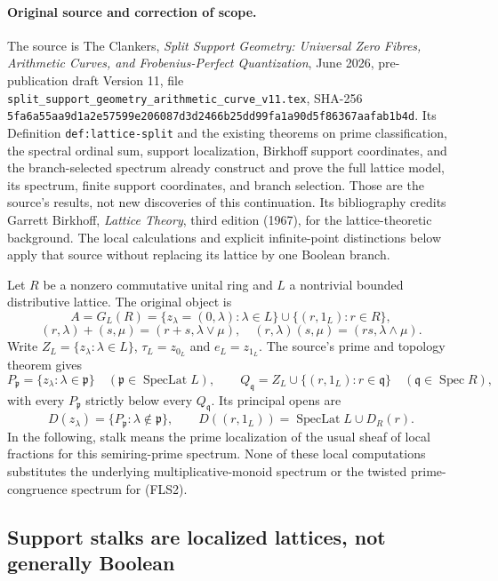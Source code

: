 \documentclass[11pt]{article}
\begin{document}
\paragraph{Original source and correction of scope.}
The source is The Clankers, \emph{Split Support Geometry: Universal
Zero Fibres, Arithmetic Curves, and Frobenius-Perfect Quantization},
June 2026, pre-publication draft Version 11, file
\texttt{split\_support\_geometry\_arithmetic\_curve\_v11.tex},
SHA-256 \texttt{5fa6a55aa9d1a2e57599e206087d3d2466b25dd99fa1a90d5f86367aafab1b4d}.
Its Definition \texttt{def:lattice-split} and the existing theorems
on prime classification, the spectral ordinal sum, support
localization, Birkhoff support coordinates, and the branch-selected
spectrum already construct and prove
the full lattice model, its spectrum, finite support coordinates,
and branch selection. Those are the source's results, not new
discoveries of this continuation. Its bibliography credits
Garrett Birkhoff, \emph{Lattice Theory}, third edition (1967),
for the lattice-theoretic background. The local calculations
and explicit infinite-point distinctions below apply that
source without replacing its lattice by one Boolean branch.

Let $R$ be a nonzero commutative unital ring and $L$ a nontrivial
bounded distributive lattice. The original object is
\[
A=G_L(R)=\{z_\lambda=(0,\lambda):\lambda\in L\}
\cup\{(r,1_L):r\in R\},
\]
\[
(r,\lambda)+(s,\mu)=(r+s,\lambda\vee\mu),
\quad (r,\lambda)(s,\mu)=(rs,\lambda\wedge\mu).
\tag{FLS1}
\]
Write $Z_L=\{z_\lambda:\lambda\in L\}$,
$\tau_L=z_{0_L}$ and $e_L=z_{1_L}$. The source's prime and
topology theorem gives
\[
P_{\mathfrak p}=\{z_\lambda:\lambda\in\mathfrak p\}
\quad(\mathfrak p\in\operatorname{SpecLat}L),\qquad
Q_{\mathfrak q}=Z_L\cup\{(r,1_L):r\in\mathfrak q\}
\quad(\mathfrak q\in\operatorname{Spec}R),
\tag{FLS2}
\]
with every $P_{\mathfrak p}$ strictly below every
$Q_{\mathfrak q}$. Its principal opens are
\[
D(z_\lambda)=\{P_{\mathfrak p}:\lambda\notin\mathfrak p\},
\qquad
D((r,1_L))=\operatorname{SpecLat}L\cup D_R(r).
\tag{FLS3}
\]
In the following, stalk means the prime localization of the
usual sheaf of local fractions for this semiring-prime
spectrum. None of these local computations substitutes the
underlying multiplicative-monoid spectrum or the twisted
prime-congruence spectrum for (FLS2).

\subsection{Support stalks are localized lattices, not generally Boolean}
\end{document}
